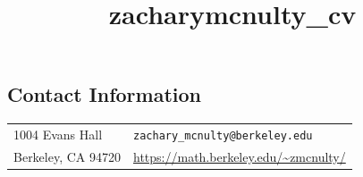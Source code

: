 \documentclass[margin,line,pifont,palatino,courier]{res}
\begin{document}
\title{zacharymcnulty_cv}
\begin{resume}

\section{\sc Contact Information}

\vspace{.05in}
\begin{tabular}{@{}p{2.25in}p{2.9in}}
1004 Evans Hall & \verb+zachary_mcnulty@berkeley.edu+ \\
Berkeley, CA 94720      &\url{https://math.berkeley.edu/~zmcnulty/} \\
\end{tabular}


% 


%







\end{resume}
\end{document}
